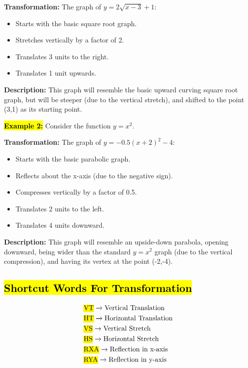 \documentclass[12pt,a4paper]{article}
\begin{document}
\textbf{Transformation:} The graph of \(y = 2\sqrt{x-3} + 1\):

\begin{itemize}
    \item Starts with the basic square root graph.
    \item Stretches vertically by a factor of 2.
    \item Translates 3 units to the right.
    \item Translates 1 unit upwards.
\end{itemize}

\textbf{Description:} This graph will resemble the basic upward curving square root graph, but will be steeper (due to the vertical stretch), and shifted to the point (3,1) as its starting point.

\textbf{\hl{Example 2:}} Consider the function \(y = x^2\).

\textbf{Transformation:} The graph of \(y = -0.5(x+2)^2 - 4\):

\begin{itemize}
    \item Starts with the basic parabolic graph.
    \item Reflects about the x-axis (due to the negative sign).
    \item Compresses vertically by a factor of 0.5.
    \item Translates 2 units to the left.
    \item Translates 4 units downward.
\end{itemize}

\textbf{Description:} This graph will resemble an upside-down parabola, opening downward, being wider than the standard \(y = x^2\) graph (due to the vertical compression), and having its vertex at the point (-2,-4).

\subsection*{\hl{Shortcut Words For Transformation}}
\begin{align*}
    & \text{\hl{VT}} \xrightarrow{} \text{Vertical Translation} \\
    & \text{\hl{HT}} \xrightarrow{} \text{Horizontal Translation} \\
    & \text{\hl{VS}} \xrightarrow{} \text{Vertical Stretch} \\
    & \text{\hl{HS}} \xrightarrow{} \text{Horizontal Stretch} \\
    & \text{\hl{RXA}} \xrightarrow{} \text{Reflection in x-axis} \\
    & \text{\hl{RYA}} \xrightarrow{} \text{Reflection in y-axis} \\
\end{align*}
\end{document}

